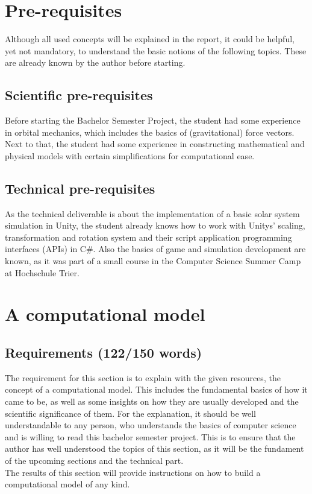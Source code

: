 \documentclass[conference,compsoc]{IEEEtran}
\begin{document}

\section{Pre-requisites} 
Although all used concepts will be explained in the report, it could be helpful, yet not mandatory, to understand the basic notions of the following topics. These are already known by the author before starting. 
\subsection{Scientific pre-requisites}
Before starting the Bachelor Semester Project, the student had some experience in orbital mechanics, which includes the basics of (gravitational) force vectors. \\
Next to that, the student had some experience in constructing mathematical and physical models with certain simplifications for computational ease.
\subsection{Technical pre-requisites}
As the technical deliverable is about the implementation of a basic solar system simulation in Unity, the student already knows how to work with Unitys' scaling, transformation and rotation system and their script application programming interfaces (APIs) in C\#. Also the basics of game and simulation development are known, as it was part of a small course in the Computer Science Summer Camp at Hochschule Trier.

\section{A computational model}
\label{sec-computational-model}
\subsection{Requirements (122/150 words)}
The requirement for this section is to explain with the given resources, the concept of a computational model. This includes the fundamental basics of how it came to be, as well as some insights on how they are usually developed and the scientific significance of them. For the explanation, it should be well understandable to any person, who understands the basics of computer science and is willing to read this bachelor semester project. This is to ensure that the author has well understood the topics of this section, as it will be the fundament of the upcoming sections and the technical part.\\
The results of this section will provide instructions on how to build a computational model of any kind. 
\end{document}

